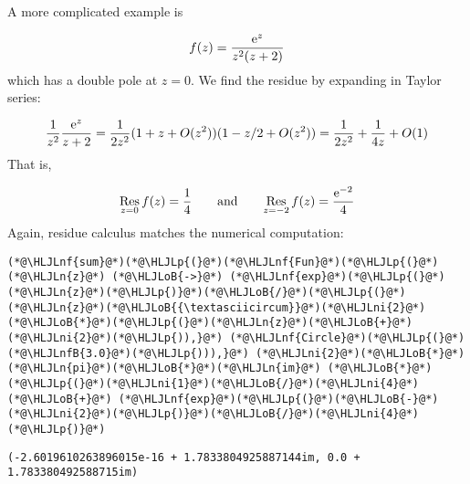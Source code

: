 \documentclass[12pt,landscape]{article}
\newcommand{\HLJLn}[1]{#1}
\newcommand{\HLJLnf}[1]{\textcolor[RGB]{66,102,213}{#1}}
\newcommand{\HLJLnfB}[1]{\textcolor[RGB]{59,151,46}{#1}}
\newcommand{\HLJLni}[1]{\textcolor[RGB]{59,151,46}{#1}}
\newcommand{\HLJLoB}[1]{\textcolor[RGB]{102,102,102}{\textbf{#1}}}
\newcommand{\HLJLp}[1]{#1}
\def\qqand{\qquad\hbox{and}\qquad}
\def\E{ {\rm e} }
\def\Res_#1{\underset{#1}{\rm Res}\,}
\begin{document}
{A more complicated example is

\[
f(z) = {\E^z \over z^2 (z+2)}
\]
which has a double pole at $z = 0$. We find the residue by expanding in Taylor series:

\[
 {1 \over z^2} {\E^z \over z +2} = {1 \over  2 z^2} (1 + z + O(z^2)) (1 - z/2 + O(z^2)) =
        {1 \over 2 z^2} + {1 \over 4 z} + O(1)
\]
That is,

\[
\Res_{z=0} f(z) = {1 \over 4} \qqand \Res_{z=-2} f(z) = {\E^{-2} \over 4}
\]
Again, residue calculus matches the numerical computation:


\begin{lstlisting}
(*@\HLJLnf{sum}@*)(*@\HLJLp{(}@*)(*@\HLJLnf{Fun}@*)(*@\HLJLp{(}@*)(*@\HLJLn{z}@*) (*@\HLJLoB{->}@*) (*@\HLJLnf{exp}@*)(*@\HLJLp{(}@*)(*@\HLJLn{z}@*)(*@\HLJLp{)}@*)(*@\HLJLoB{/}@*)(*@\HLJLp{(}@*)(*@\HLJLn{z}@*)(*@\HLJLoB{{\textasciicircum}}@*)(*@\HLJLni{2}@*)(*@\HLJLoB{*}@*)(*@\HLJLp{(}@*)(*@\HLJLn{z}@*)(*@\HLJLoB{+}@*)(*@\HLJLni{2}@*)(*@\HLJLp{)),}@*) (*@\HLJLnf{Circle}@*)(*@\HLJLp{(}@*)(*@\HLJLnfB{3.0}@*)(*@\HLJLp{))),}@*) (*@\HLJLni{2}@*)(*@\HLJLoB{*}@*)(*@\HLJLn{pi}@*)(*@\HLJLoB{*}@*)(*@\HLJLn{im}@*) (*@\HLJLoB{*}@*) (*@\HLJLp{(}@*)(*@\HLJLni{1}@*)(*@\HLJLoB{/}@*)(*@\HLJLni{4}@*) (*@\HLJLoB{+}@*) (*@\HLJLnf{exp}@*)(*@\HLJLp{(}@*)(*@\HLJLoB{-}@*)(*@\HLJLni{2}@*)(*@\HLJLp{)}@*)(*@\HLJLoB{/}@*)(*@\HLJLni{4}@*)(*@\HLJLp{)}@*)
\end{lstlisting}

\begin{lstlisting}
(-2.6019610263896015e-16 + 1.7833804925887144im, 0.0 + 1.783380492588715im)
\end{lstlisting}


}
\end{document}
